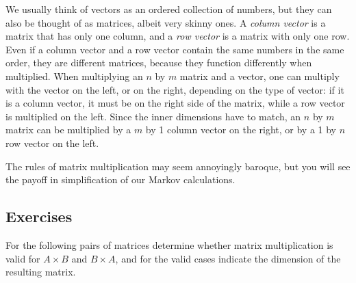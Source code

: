 \documentclass[
]{book}
\theoremstyle{definition}
\theoremstyle{definition}
\theoremstyle{definition}
\theoremstyle{remark}
\begin{document}
We usually think of vectors as an ordered collection of numbers, but they can also be thought of as matrices, albeit very skinny ones. A \emph{column vector} is a matrix that has only one column, and a \emph{row vector} is a matrix with only one row. Even if a column vector and a row vector contain the same numbers in the same order, they are different matrices, because they function differently when multiplied. When multiplying an \(n\) by \(m\) matrix and a vector, one can multiply with the vector on the left, or on the right, depending on the type of vector: if it is a column vector, it must be on the right side of the matrix, while a row vector is multiplied on the left. Since the inner dimensions have to match, an \(n\) by \(m\) matrix can be multiplied by a \(m\) by 1 column vector on the right, or by a 1 by \(n\) row vector on the left.

The rules of matrix multiplication may seem annoyingly baroque, but you will see the payoff in simplification of our Markov calculations.

\hypertarget{exercises-28}{%
\subsection{Exercises}\label{exercises-28}}

For the following pairs of matrices determine whether matrix multiplication is valid for \(A \times B\) and \(B \times A\), and for the valid cases indicate the dimension of the resulting matrix.
\end{document}
